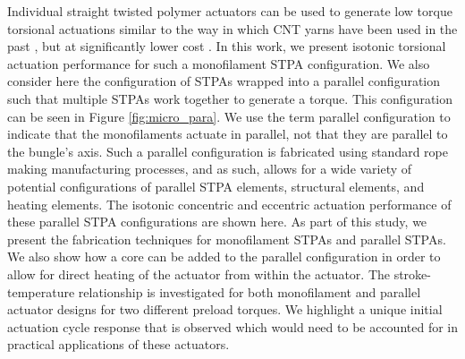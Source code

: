 \documentclass[twocolumn,10pt]{asme2e}
\begin{document}
Individual straight twisted polymer actuators can be used to generate low torque torsional actuations similar to the way in which CNT yarns have been used in the past \cite{suh_torsional}, but at significantly lower cost \cite{aziz_controlled}. In this work, we present isotonic torsional actuation performance for such a monofilament STPA configuration. We also consider here the configuration of STPAs wrapped into a parallel configuration such that multiple STPAs work together to generate a torque. This configuration can be seen in Figure \ref{fig:micro_para}. We use the term parallel configuration to indicate that the monofilaments actuate in parallel, not that they are parallel to the bungle's axis. Such a parallel configuration is fabricated using standard rope making manufacturing processes, and as such, allows for a wide variety of potential configurations of parallel STPA elements, structural elements, and heating elements. The isotonic concentric and eccentric actuation performance of these parallel STPA configurations are shown here. As part of this study, we present the fabrication techniques for monofilament STPAs and parallel STPAs. We also show how a core can be added to the parallel configuration in order to allow for direct heating of the actuator from within the actuator. The stroke-temperature relationship is investigated for both monofilament and parallel actuator designs for two different preload torques. We highlight a unique initial actuation cycle response that is observed which would need to be accounted for in practical applications of these actuators.
\end{document}
